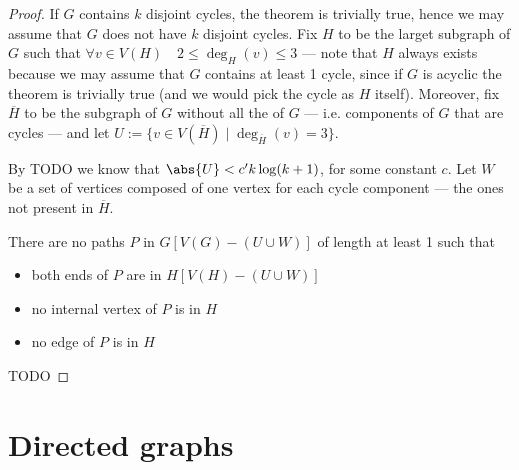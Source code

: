 \documentclass[a4paper, 12pt]{report}
\begin{document}
    \begin{proof}
        If $G$ contains $k$ disjoint cycles, the theorem is trivially true, hence we may assume that $G$ does not have $k$ disjoint cycles. Fix $H$ to be the larget subgraph of $G$ such that $\forall v \in V(H) \quad 2 \le \deg_H(v) \le 3$ --- note that $H$ always exists because we may assume that $G$ contains at least 1 cycle, since if $G$ is acyclic the theorem is trivially true (and we would pick the cycle as $H$ itself). Moreover, fix $\overline H$ to be the subgraph of $G$ without all the  of $G$ --- i.e. components of $G$ that are cycles --- and let $U := \{v \in V(\overline H) \mid \deg_{\overline H}(v) = 3\}$.

        By TODO  we know that $\abs{U} < c'k\log(k + 1)$, for some constant $c$. Let $W$ be a set of vertices composed of one vertex for each cycle component --- the ones not present in $\overline H$.


         There are no paths $P$ in $G[V(G) - (U \cup W)]$ of length at least 1 such that

        \begin{itemize}
            \item both ends of $P$ are in $H[V(H) - (U \cup W)]$
            \item no internal vertex of $P$ is in $H$
            \item no edge of $P$ is in $H$
        \end{itemize}



        TODO 
    \end{proof}

    \section{Directed graphs}
\end{document}
